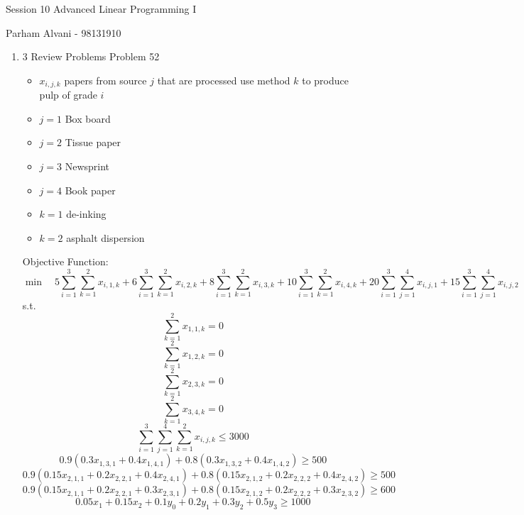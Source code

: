 \documentclass{article}
\begin{document}
\large %


{\Large Session 10 %
\hfill  Advanced Linear Programming I}

\begin{center}
{\Large Parham Alvani - 98131910} %
\end{center}
\vspace{0.05in}


\begin{enumerate}

\item 3 Review Problems Problem 52
\begin{itemize}
\item \(x_{i,j,k}\) papers from source \(j\) that are processed use method \(k\) to produce pulp of grade \(i\)
\item \(j = 1\) Box board
\item \(j = 2\) Tissue paper
\item \(j = 3\) Newsprint
\item \(j = 4\) Book paper
\item \(k = 1\) de-inking
\item \(k = 2\) asphalt dispersion
\end{itemize}
\par
Objective Function:
\[
    \min\quad
        5 \sum_{i=1}^3\sum_{k=1}^2x_{i,1,k} +
        6 \sum_{i=1}^3\sum_{k=1}^2x_{i,2,k} +
        8 \sum_{i=1}^3\sum_{k=1}^2x_{i,3,k} +
        10 \sum_{i=1}^3\sum_{k=1}^2x_{i,4,k} +
        20 \sum_{i=1}^3\sum_{j=1}^4x_{i,j,1} +
        15 \sum_{i=1}^3\sum_{j=1}^4x_{i,j,2}
\]
s.t.
\[
    \sum_{k=1}^2x_{1,1,k} = 0
\]
\[
    \sum_{k=1}^2x_{1,2,k} = 0
\]
\[
    \sum_{k=1}^2x_{2,3,k} = 0
\]
\[
    \sum_{k=1}^2x_{3,4,k} = 0
\]
\[
    \sum_{i=1}^3\sum_{j=1}^4\sum_{k=1}^2x_{i,j,k} \le 3000
\]
\[
    0.9 (0.3 x_{1,3,1} + 0.4 x_{1,4,1}) + 0.8 (0.3 x_{1,3,2} + 0.4 x_{1,4,2}) \ge 500
\]
\[
    0.9 (0.15 x_{2,1,1} + 0.2 x_{2,2,1} + 0.4 x_{2,4,1}) + 0.8 (0.15 x_{2,1,2} + 0.2 x_{2,2,2} + 0.4 x_{2,4,2}) \ge 500
\]
\[
    0.9 (0.15 x_{2,1,1} + 0.2 x_{2,2,1} + 0.3 x_{2,3,1}) + 0.8 (0.15 x_{2,1,2} + 0.2 x_{2,2,2} + 0.3 x_{2,3,2}) \ge 600
\]
\[
    0.05 x_1 + 0.15 x_2 + 0.1 y_0 + 0.2 y_1 + 0.3 y_2 + 0.5 y_3 \ge 1000
\]

\end{enumerate}

\end{document}

